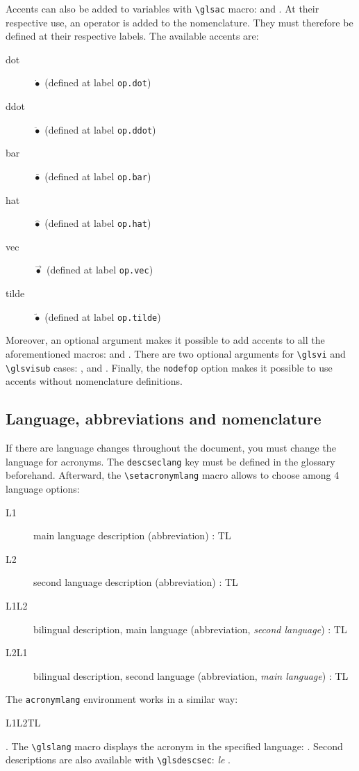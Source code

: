 \documentclass[projet,nohyperref,article,english,french]{ulthese}
\begin{document}
Accents can also be added to variables with \texttt{\textbackslash glsac} macro:  and . At their respective use, an operator is added to the nomenclature. They must therefore be defined at their respective labels. The available accents are:
\begin{description} 
\item[dot] $\dot{\bullet}$ (defined at label \texttt{op.dot})
\item[ddot] $\ddot{\bullet}$ (defined at label \texttt{op.ddot})
\item[bar] $\bar{\bullet}$ (defined at label \texttt{op.bar})
\item[hat] $\widehat{\bullet}$ (defined at label \texttt{op.hat})
\item[vec] $\vec{\bullet}$ (defined at label \texttt{op.vec})
\item[tilde] $\widetilde{\bullet}$ (defined at label \texttt{op.tilde})
\end{description}
Moreover, an optional argument makes it possible to add accents to all the aforementioned macros:  and . There are two optional arguments for \texttt{\textbackslash glsvi} and \texttt{\textbackslash glsvisub} cases: ,  and . Finally, the \texttt{nodefop} option makes it possible to use accents without nomenclature definitions.

\subsection{Language, abbreviations and nomenclature}
If there are language changes throughout the document, you must change the language for acronyms. The \texttt{descseclang} key must be defined in the glossary beforehand. Afterward, the \texttt{\textbackslash setacronymlang} macro allows to choose among 4 language options:
\begin{description}
	\item[L1] main language description (abbreviation) : \acrfull{TL}
	\item[L2] second language description (abbreviation) : \acrfull{TL}
	\item[L1L2] bilingual description, main language (abbreviation, \textit{second language}) : \acrfull{TL}
	\item[L2L1] bilingual description, second language (abbreviation, \textit{main language}) : \acrfull{TL}
\end{description}
The \texttt{acronymlang} environment works in a similar way: \begin{acronymlang}{L1L2}\acrfull{TL}\end{acronymlang}. The \texttt{\textbackslash glslang} macro displays the acronym in the specified language: . Second descriptions are also available with \texttt{\textbackslash glsdescsec}: \textit{le }.
\end{document}
